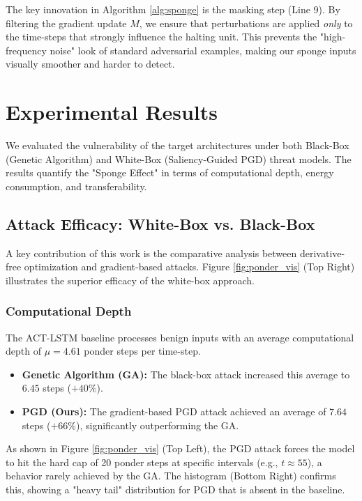 \documentclass[conference]{IEEEtran}
\begin{document}
The key innovation in Algorithm \ref{alg:sponge} is the masking step (Line 9). By filtering the gradient update $M$, we ensure that perturbations are applied \textit{only} to the time-steps that strongly influence the halting unit. This prevents the "high-frequency noise" look of standard adversarial examples, making our sponge inputs visually smoother and harder to detect.

\section{Experimental Results}
\label{sec:results}

We evaluated the vulnerability of the target architectures under both Black-Box (Genetic Algorithm) and White-Box (Saliency-Guided PGD) threat models. The results quantify the "Sponge Effect" in terms of computational depth, energy consumption, and transferability.

\subsection{Attack Efficacy: White-Box vs. Black-Box}
A key contribution of this work is the comparative analysis between derivative-free optimization and gradient-based attacks. Figure \ref{fig:ponder_vis} (Top Right) illustrates the superior efficacy of the white-box approach.

\subsubsection{Computational Depth}
The ACT-LSTM baseline processes benign inputs with an average computational depth of $\mu=4.61$ ponder steps per time-step. 
\begin{itemize}
    \item \textbf{Genetic Algorithm (GA):} The black-box attack increased this average to $6.45$ steps ($+40\%$).
    \item \textbf{PGD (Ours):} The gradient-based PGD attack achieved an average of $7.64$ steps ($+66\%$), significantly outperforming the GA.
\end{itemize}
As shown in Figure \ref{fig:ponder_vis} (Top Left), the PGD attack forces the model to hit the hard cap of 20 ponder steps at specific intervals (e.g., $t \approx 55$), a behavior rarely achieved by the GA. The histogram (Bottom Right) confirms this, showing a "heavy tail" distribution for PGD that is absent in the baseline.
\end{document}
